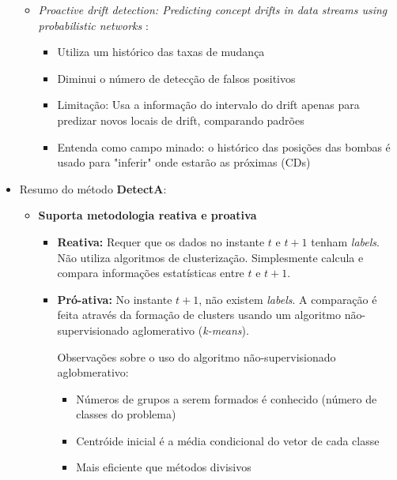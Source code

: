 \documentclass[qual, classic, a4paper]{ufbathesis}
\begin{document}
\begin{itemize}
\begin{itemize}
        \item \textit{Proactive drift detection: Predicting concept drifts in data streams using probabilistic networks} \cite{ProactiveDriftDetectionProbabilistic}: 
        \begin{itemize}
            \item Utiliza um histórico das taxas de mudança
            \item Diminui o número de detecção de falsos positivos
            \item Limitação: Usa a informação do intervalo do drift apenas para predizar novos locais de drift, comparando padrões
            \item Entenda como campo minado: o histórico das posições das bombas é usado para "inferir" onde estarão as próximas (CDs)
        \end{itemize}
    \end{itemize}

    \item Resumo do método \textbf{DetectA}:
    \begin{itemize}
        \item \textbf{Suporta metodologia reativa e proativa}
        
        \begin{itemize}
            \item \textbf{Reativa:} Requer que os dados no instante $t$ e $t + 1$ tenham \textit{labels}. 
            Não utiliza algoritmos de clusterização. Simplesmente calcula e compara informações estatísticas entre $t$ e $t + 1$.
            \item \textbf{Pró-ativa:} No instante $t + 1$, não existem \textit{labels}. A comparação é feita através da formação de clusters usando um algoritmo não-supervisionado aglomerativo (\textit{k-means}).

            Observações sobre o uso do algoritmo não-supervisionado aglobmerativo:
            \begin{itemize}
                \item Números de grupos a serem formados é conhecido (número de classes do problema)
                \item Centróide inicial é a média condicional do vetor de cada classe
                \item Mais eficiente que métodos divisivos
            \end{itemize}
        \end{itemize}
    \end{itemize}


\end{itemize}
\end{document}
